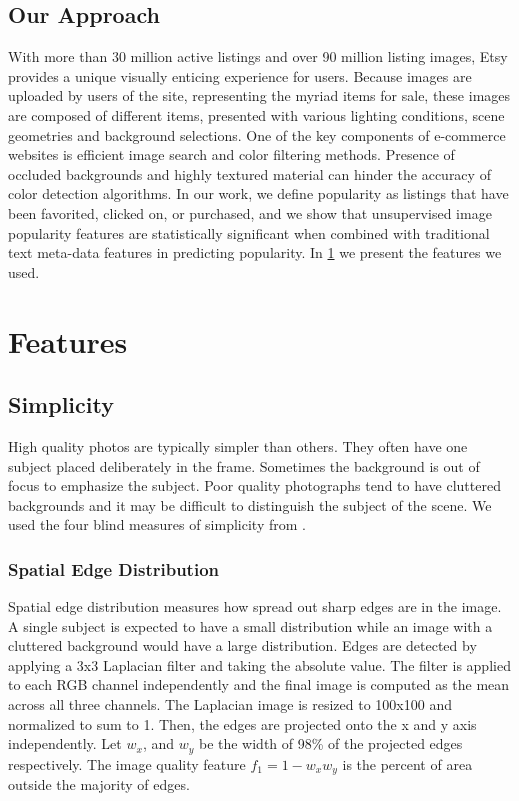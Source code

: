 \documentclass[conference,a4paper]{IEEEtran}
\begin{document}
\subsection{Our Approach}
With more than 30 million active listings and over 90 million listing images, Etsy provides a unique visually enticing experience
for users. Because images are uploaded by users of the site,
representing the myriad items for sale, these images are composed of different items, presented with various
lighting conditions, scene geometries and background selections. One of
the key components of e-commerce websites is
efficient image search and color filtering methods. Presence of occluded backgrounds and highly
textured material can hinder the accuracy of color detection
algorithms.  In our work, we define popularity as listings that have been favorited, clicked on, or purchased, and we show that unsupervised image popularity features are statistically significant when combined with traditional text meta-data features in predicting popularity.  In \ref{sec:features} we present the features we used.

\section{Features}
\label{sec:features}
  \subsection{Simplicity}
  High quality photos are typically simpler than others.  They often have one subject placed deliberately in the frame.  Sometimes the background is out of focus to emphasize the subject.  Poor quality photographs tend to have cluttered backgrounds and it may be difficult to distinguish the subject of the scene.  We used the four blind measures of simplicity from \cite{ke2006design}.

  \subsubsection{Spatial Edge Distribution}
  Spatial edge distribution measures how spread out sharp edges are in the image.  A single subject is expected to have a small distribution while an image with a cluttered background would have a large distribution.  Edges are detected by applying a 3x3 Laplacian filter and taking the absolute value.  The filter is applied to each RGB channel independently and the final image is computed as the mean across all three channels.  The Laplacian image is resized to 100x100 and normalized to sum to 1.  Then, the edges are projected onto the x and y axis independently.  Let $w_x$, and $w_y$ be the width of 98\% of the projected edges respectively.  The image quality feature $f_1 = 1 - w_x w_y$ is the percent of area outside the majority of edges.
\end{document}
